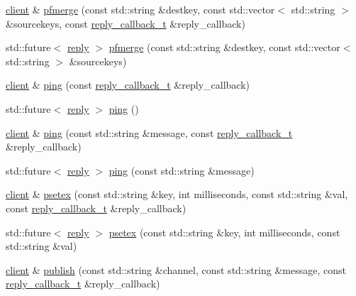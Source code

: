 \begin{DoxyCompactItemize}
\item 
\hyperlink{classcpp__redis_1_1client}{client} \& \hyperlink{classcpp__redis_1_1client_aad4f7f35b13e4d236d178ed47a499353}{pfmerge} (const std\+::string \&destkey, const std\+::vector$<$ std\+::string $>$ \&sourcekeys, const \hyperlink{classcpp__redis_1_1client_a061a1140d36d2eaeda82b09a0bb3f9f2}{reply\+\_\+callback\+\_\+t} \&reply\+\_\+callback)
\item 
std\+::future$<$ \hyperlink{classcpp__redis_1_1reply}{reply} $>$ \hyperlink{classcpp__redis_1_1client_acfeb0b2a7adb65d9cb940d96b9d24478}{pfmerge} (const std\+::string \&destkey, const std\+::vector$<$ std\+::string $>$ \&sourcekeys)
\item 
\hyperlink{classcpp__redis_1_1client}{client} \& \hyperlink{classcpp__redis_1_1client_a19f0127614ca1369dcf739427079f7ec}{ping} (const \hyperlink{classcpp__redis_1_1client_a061a1140d36d2eaeda82b09a0bb3f9f2}{reply\+\_\+callback\+\_\+t} \&reply\+\_\+callback)
\item 
std\+::future$<$ \hyperlink{classcpp__redis_1_1reply}{reply} $>$ \hyperlink{classcpp__redis_1_1client_a5273cf454284e04f4c43e1b391170009}{ping} ()
\item 
\hyperlink{classcpp__redis_1_1client}{client} \& \hyperlink{classcpp__redis_1_1client_a399c32f46d82d844b661647f64d9fb97}{ping} (const std\+::string \&message, const \hyperlink{classcpp__redis_1_1client_a061a1140d36d2eaeda82b09a0bb3f9f2}{reply\+\_\+callback\+\_\+t} \&reply\+\_\+callback)
\item 
std\+::future$<$ \hyperlink{classcpp__redis_1_1reply}{reply} $>$ \hyperlink{classcpp__redis_1_1client_a5efa4ecc6b105a2464b22cd873caae39}{ping} (const std\+::string \&message)
\item 
\hyperlink{classcpp__redis_1_1client}{client} \& \hyperlink{classcpp__redis_1_1client_a732ba849342f9d8c67111f6cb6cb198c}{psetex} (const std\+::string \&key, int milliseconds, const std\+::string \&val, const \hyperlink{classcpp__redis_1_1client_a061a1140d36d2eaeda82b09a0bb3f9f2}{reply\+\_\+callback\+\_\+t} \&reply\+\_\+callback)
\item 
std\+::future$<$ \hyperlink{classcpp__redis_1_1reply}{reply} $>$ \hyperlink{classcpp__redis_1_1client_a69712c925c1496ab9531a5fd1888ad93}{psetex} (const std\+::string \&key, int milliseconds, const std\+::string \&val)
\item 
\hyperlink{classcpp__redis_1_1client}{client} \& \hyperlink{classcpp__redis_1_1client_a1fba121a3d6e50811448e35917badfc6}{publish} (const std\+::string \&channel, const std\+::string \&message, const \hyperlink{classcpp__redis_1_1client_a061a1140d36d2eaeda82b09a0bb3f9f2}{reply\+\_\+callback\+\_\+t} \&reply\+\_\+callback)

\end{DoxyCompactItemize}
